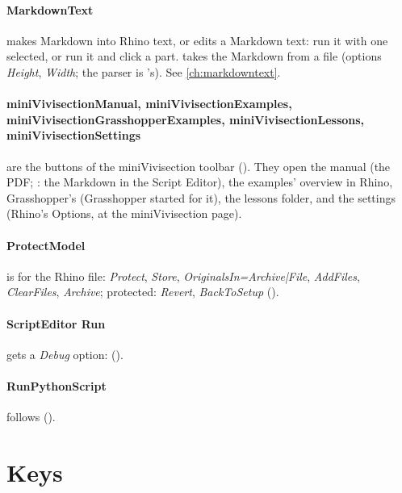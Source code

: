 \paragraph{MarkdownText} makes Markdown into Rhino text, or edits a Markdown text: run it with one selected, or run it and
click a part.  takes the Markdown from a file (options \emph{Height}, \emph{Width}; the parser is 's).
See \cref{ch:markdowntext}.

\paragraph{miniVivisectionManual, miniVivisectionExamples, miniVivisectionGrasshopperExamples, miniVivisectionLessons,
miniVivisectionSettings} are the buttons of the miniVivisection toolbar (). They open the
manual (the PDF; : the Markdown in the Script Editor), the examples' overview in Rhino,
Grasshopper's (Grasshopper started for it), the lessons folder, and the settings (Rhino's Options, at the miniVivisection page).

\paragraph{ProtectModel} is  for the Rhino file: \emph{Protect}, \emph{Store}, \emph{OriginalsIn=Archive|File},
\emph{AddFiles}, \emph{ClearFiles}, \emph{Archive}; protected: \emph{Revert}, \emph{BackToSetup} ().

\paragraph{ScriptEditor Run} gets a \emph{Debug} option:  ().

\paragraph{RunPythonScript} follows  ().

\section{Keys}\label{sec:keys}

